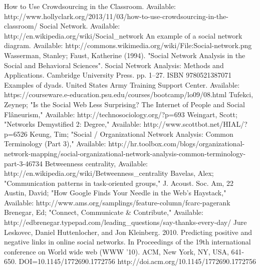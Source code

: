 \documentclass[conference,letterpaper]{IEEEtran}
\begin{document}
\begin{thebibliography}{1}
How to Use Crowdsourcing in the Classroom. Available: http://www.hollyclark.org/2013/11/03/how-to-use-crowdsourcing-in-the-classroom/
Social Network. Available: http://en.wikipedia.org/wiki/Social\_network
An example of a social network diagram. Available: http://commons.wikimedia.org/wiki/File:Social-network.png
Wasserman, Stanley; Faust, Katherine (1994). "Social Network Analysis in the Social and Behavioral Sciences". Social Network Analysis: Methods and Applications. Cambridge University Press. pp. 1–27. ISBN 9780521387071
Examples of dyads. United States Army Training Support Center. Available: https://courseware.e-education.psu.edu/courses/bootcamp/lo09/08.html
Tufekci, Zeynep; "Is the Social Web Less Surprising? The Internet of People and Social Flâneurism," Available: http://technosociology.org/?p=693
Weingart, Scott; "Networks Demystified 2: Degree," Available: http://www.scottbot.net/HIAL/?p=6526
Keung, Tim; "Social / Organizational Network Analysis: Common Terminology (Part 3)," Available: http://hr.toolbox.com/blogs/organizational-network-mapping/social-organizational-network-analysis-common-terminology-part-3-46734
Betweenness centrality, Available: http://en.wikipedia.org/wiki/Betweenness\_centrality
Bavelas, Alex; "Communication patterns in task-oriented groups," J. Acoust. Soc. Am, 22
Austin, David; "How Google Finds Your Needle in the Web's Haystack," Available: http://www.ams.org/samplings/feature-column/fcarc-pagerank
Brenegar, Ed; "Connect, Communicate \& Contribute," Available: http://edbrenegar.typepad.com/leading\_questions/say-thanks-every-day/
Jure Leskovec, Daniel Huttenlocher, and Jon Kleinberg. 2010. Predicting positive and negative links in online social networks. In Proceedings of the 19th international conference on World wide web (WWW '10). ACM, New York, NY, USA, 641-650. DOI=10.1145/1772690.1772756 http://doi.acm.org/10.1145/1772690.1772756

\end{thebibliography}
\end{document}
